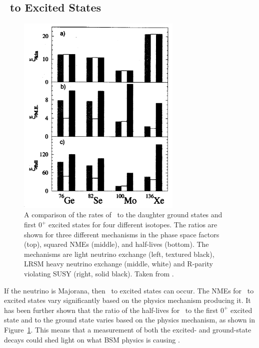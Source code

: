\documentclass[/main.tex]{subfiles}
\begin{document}
\subsection{\znbb\ to Excited States}
\begin{figure}[t]
  \centering
  \includegraphics[width=0.7\textwidth]{esmechanismratio}
  \caption[]{\label{fig:esmechanism}
    A comparison of the rates of \znbb\ to the daughter ground states and first $0^+$ excited states for four different isotopes. The ratios are shown for three different mechanisms in the phase space factors (top), squared NMEs (middle), and half-lives (bottom). The mechanisms are light neutrino exchange (left, textured black), LRSM heavy neutrino exchange (middle, white) and R-parity violating SUSY (right, solid black). Taken from \cite{Simkovic2002}.
  }
\end{figure}
If the neutrino is Majorana, then \znbb\ to excited states can occur.
The NMEs for \znbb\ to excited states vary significantly based on the physics mechanism producing it.
It has been further shown that the ratio of the half-lives for \znbb\ to the first $0^+$ excited state and to the ground state varies based on the physics mechanism, as shown in Figure~\ref{fig:esmechanism}\cite{Simkovic2002, Suhonen2016}.
This means that a measurement of both the excited- and ground-state decays could shed light on what BSM physics is causing \znbb.
\end{document}
